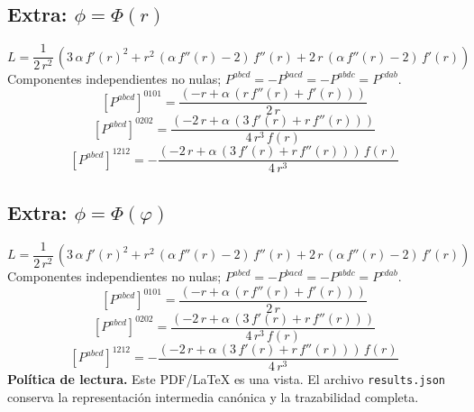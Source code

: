 \documentclass[11pt]{article}
\begin{document}
\subsection*{Extra: $\phi=\Phi\!\left(r\right)$}
\begin{dmath*}[breakdepth={5}]
L=\frac{1}{2\,{r}^{2}}\,\left(3\,\alpha\,{f'\!\left(r\right)}^{2} + {r}^{2}\,\left(\alpha\,f''\!\left(r\right) - 2\right)\,f''\!\left(r\right) + 2\,r\,\left(\alpha\,f''\!\left(r\right) - 2\right)\,f'\!\left(r\right)\right)
\end{dmath*}
Componentes independientes no nulas; $P^{abcd}=-P^{bacd}=-P^{abdc}=P^{cdab}$.
\begin{dmath*}[breakdepth={5}]
\left[P^{abcd}\right]^{0101}=\frac{\left(-r + \alpha\,\left(r\,f''\!\left(r\right) + f'\!\left(r\right)\right)\right)}{2\,r}
\end{dmath*}
\begin{dmath*}[breakdepth={5}]
\left[P^{abcd}\right]^{0202}=\frac{\left(-2\,r + \alpha\,\left(3\,f'\!\left(r\right) + r\,f''\!\left(r\right)\right)\right)}{4\,{r}^{3}\,f\!\left(r\right)}
\end{dmath*}
\begin{dmath*}[breakdepth={5}]
\left[P^{abcd}\right]^{1212}=-\frac{\left(-2\,r + \alpha\,\left(3\,f'\!\left(r\right) + r\,f''\!\left(r\right)\right)\right)\,f\!\left(r\right)}{4\,{r}^{3}}
\end{dmath*}
\subsection*{Extra: $\phi=\Phi\!\left(\varphi\right)$}
\begin{dmath*}[breakdepth={5}]
L=\frac{1}{2\,{r}^{2}}\,\left(3\,\alpha\,{f'\!\left(r\right)}^{2} + {r}^{2}\,\left(\alpha\,f''\!\left(r\right) - 2\right)\,f''\!\left(r\right) + 2\,r\,\left(\alpha\,f''\!\left(r\right) - 2\right)\,f'\!\left(r\right)\right)
\end{dmath*}
Componentes independientes no nulas; $P^{abcd}=-P^{bacd}=-P^{abdc}=P^{cdab}$.
\begin{dmath*}[breakdepth={5}]
\left[P^{abcd}\right]^{0101}=\frac{\left(-r + \alpha\,\left(r\,f''\!\left(r\right) + f'\!\left(r\right)\right)\right)}{2\,r}
\end{dmath*}
\begin{dmath*}[breakdepth={5}]
\left[P^{abcd}\right]^{0202}=\frac{\left(-2\,r + \alpha\,\left(3\,f'\!\left(r\right) + r\,f''\!\left(r\right)\right)\right)}{4\,{r}^{3}\,f\!\left(r\right)}
\end{dmath*}
\begin{dmath*}[breakdepth={5}]
\left[P^{abcd}\right]^{1212}=-\frac{\left(-2\,r + \alpha\,\left(3\,f'\!\left(r\right) + r\,f''\!\left(r\right)\right)\right)\,f\!\left(r\right)}{4\,{r}^{3}}
\end{dmath*}
\bigskip\noindent\textbf{Política de lectura.} Este PDF/LaTeX es una vista. El archivo \texttt{results.json} conserva la representación intermedia canónica y la trazabilidad completa.
\end{document}
